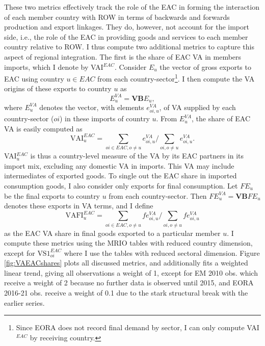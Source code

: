 \documentclass[a4paper]{article}
\begin{document}
%
These two metrics effectively track the role of the EAC in forming the interaction of each member country with ROW in terms of backwards and forwards production and export linkages. They do, however, not account for the import side, i.e., the role of the EAC in providing goods and services to each member country relative to ROW. I thus compute two additional metrics to capture this aspect of regional integration. The first is the share of EAC VA in members imports, which I denote by VAI$^{EAC}$. Consider $E_u$ the vector of gross exports to EAC using country $u \in EAC$ from each country-sector\footnote{Since EORA does not record final demand by sector, I can only compute VAI$^{EAC}$ by receiving country. \vspace{-8mm}}. I then compute the VA origins of these exports to country $u$ as 
%
\begin{equation}
E_u^{VA} = \textbf{VB}E_u,
\end{equation}
%
\noindent where $E_u^{VA}$ denotes the vector, with elements $e_{oi, u}^{VA}$, of VA supplied by each country-sector ($oi$) in these imports of country $u$. From  $E_u^{VA}$, the share of EAC VA is easily computed as 
%
\begin{equation}
\text{VAI}_u^{EAC} = \sum_{oi \in EAC, o \neq u}  e_{oi, u}^{VA}  \bigg/ \sum_{oi, o \neq u}  e_{oi, u}^{VA}.  
\end{equation}
%
VAI$_u^{EAC}$ is thus a country-level measure of the VA by its EAC partners in its import mix, excluding any domestic VA in imports. This VA may include intermediates of exported goods. To single out the EAC share in imported consumption goods, I also consider only exports for final consumption. Let $FE_u$ be the final exports to country $u$ from each country-sector. Then $FE_u^{VA} = \textbf{VB}FE_u$ denotes these exports in VA terms, and I define
%
\begin{equation} \label{eq:VAFI_EAC}
\text{VAFI}_{u}^{EAC} = \sum_{oi \in EAC, o \neq u}  fe_{oi, u}^{VA}  \bigg/ \sum_{oi, o \neq u}  fe_{oi, u}^{VA}
\end{equation}
%
\noindent as the EAC VA share in final goods exported to a particular member $u$. I compute these metrics using the MRIO tables with reduced country dimension, except for $\text{VS1}_{oi}^{EAC}$ where I use the tables with reduced sectoral dimension. Figure \ref{fig:VAEACshares} plots all discussed metrics, and additionally fits a weighted linear trend, giving all observations a weight of 1, except for EM 2010 obs. which receive a weight of 2 because no further data is observed until 2015, and EORA 2016-21 obs. receive a weight of 0.1 due to the stark structural break with the earlier series. 
\end{document}
